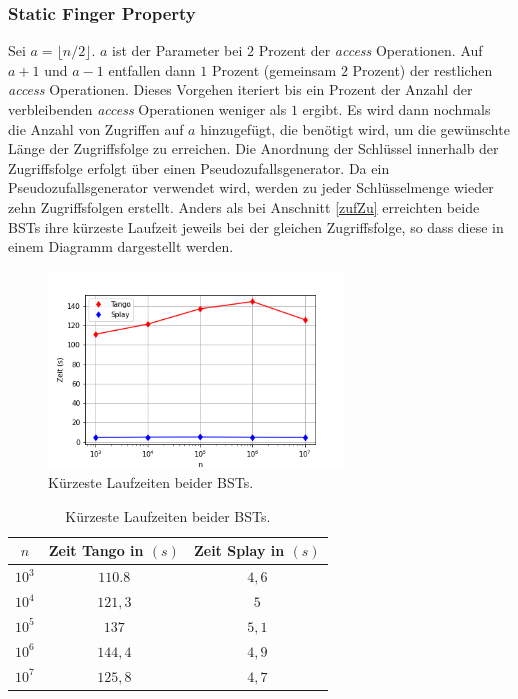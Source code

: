 \documentclass[a4paper,12pt]{article}
\begin{document}
\subsubsection{Static Finger Property}
Sei $a = \lfloor n / 2\rfloor$.  $a$ ist der Parameter bei $2$ Prozent der \textit{access} Operationen. Auf $a+1$ und $a-1$ entfallen dann $1$ Prozent (gemeinsam $2$ Prozent) der restlichen \textit{access} Operationen. Dieses Vorgehen iteriert bis ein Prozent der Anzahl der verbleibenden \textit{access} Operationen weniger als $1$ ergibt. Es wird dann nochmals die Anzahl von Zugriffen auf $a$ hinzugefügt, die benötigt wird, um die gewünschte Länge der Zugriffsfolge zu erreichen. Die Anordnung der Schlüssel innerhalb der Zugriffsfolge erfolgt über einen Pseudozufallsgenerator. Da ein Pseudozufallsgenerator verwendet wird, werden zu jeder Schlüsselmenge wieder zehn Zugriffsfolgen erstellt. Anders als bei Anschnitt \ref{zufZu} erreichten beide BSTs ihre kürzeste Laufzeit jeweils bei der gleichen Zugriffsfolge, so dass diese in einem Diagramm dargestellt werden.\\ 
\begin{figure}[H]
	\centering
	\includegraphics[width=0.7\textwidth]{"Medien/laufzeittest/diagramm/staticfinger1"}
	\caption{Kürzeste Laufzeiten beider BSTs.}
\end{figure}
\begin{table}[H]
	\begin{center}
		\begin{tabular}[c]{|c|c|c|}
			\hline
			$n$ & Zeit Tango in $\left(s\right)$ &Zeit Splay in $\left(s\right)$ \\
			\hline
			$10^3$ & $110.8$ &$4,6$ \\
			\hline
			$10^4$  & $121,3$ &$5$  \\
			\hline
			$10^5$  & $137$ &  $5,1$  \\
			\hline
			$10^6$  & $144,4$ &$4,9$  \\
			\hline
			$10^7$  & $125,8$ &$4,7$  \\
			\hline
		\end{tabular}
		\caption{Kürzeste Laufzeiten beider BSTs.} 
	\end{center}
\end{table}
\end{document}
